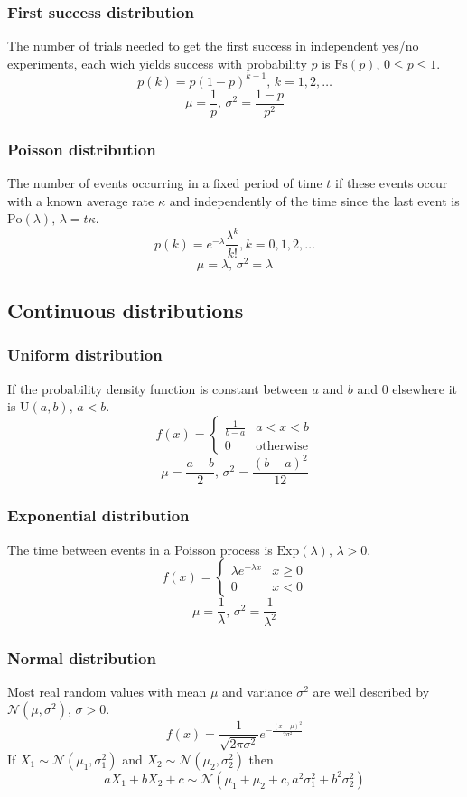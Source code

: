 \documentclass[
	a4paper,
	landscape,
	10pt,
]{article}
\begin{document}
\begin{multicols}{3}
\subsubsection*{First success distribution}
The number of trials needed to get the first success in independent yes/no experiments, each wich yields success with probability $p$ is $\textrm{Fs}(p),\,0\leq p\leq1$.
\[p(k)=p(1-p)^{k-1},\,k=1,2,\dots\]
\[\mu = \frac1p,\,\sigma^2=\frac{1-p}{p^2}\]

\subsubsection*{Poisson distribution}
The number of events occurring in a fixed period of time $t$ if these events occur with a known average rate $\kappa$ and independently of the time since the last event is $\textrm{Po}(\lambda),\,\lambda=t\kappa$.
\[p(k)=e^{-\lambda}\frac{\lambda^k}{k!}, k=0,1,2,\dots\]
\[\mu=\lambda,\,\sigma^2=\lambda\]

\subsection{Continuous distributions}

\subsubsection*{Uniform distribution}
If the probability density function is constant between $a$ and $b$ and 0 elsewhere it is $\textrm{U}(a,b),\,a<b$.
\[f(x) = \left\{
\begin{array}{cl}
\frac{1}{b-a} & a<x<b\\
0 & \textrm{otherwise}
\end{array}\right.\]
\[\mu=\frac{a+b}{2},\,\sigma^2=\frac{(b-a)^2}{12}\]

\subsubsection*{Exponential distribution}
The time between events in a Poisson process is $\textrm{Exp}(\lambda),\,\lambda>0$.
\[f(x) = \left\{
\begin{array}{cl}
\lambda e^{-\lambda x} & x\geq0\\
0 & x<0
\end{array}\right.\]
\[\mu=\frac{1}{\lambda},\,\sigma^2=\frac{1}{\lambda^2}\]

\subsubsection*{Normal distribution}
Most real random values with mean $\mu$ and variance $\sigma^2$ are well described by $\mathcal{N}(\mu,\sigma^2),\,\sigma>0$.
\[ f(x) = \frac{1}{\sqrt{2\pi\sigma^2}}e^{-\frac{(x-\mu)^2}{2\sigma^2}} \]
If $X_1 \sim \mathcal{N}(\mu_1,\sigma_1^2)$ and $X_2 \sim \mathcal{N}(\mu_2,\sigma_2^2)$ then
\[ aX_1 + bX_2 + c \sim \mathcal{N}(\mu_1+\mu_2+c,a^2\sigma_1^2+b^2\sigma_2^2) \]

\end{multicols}
\end{document}
